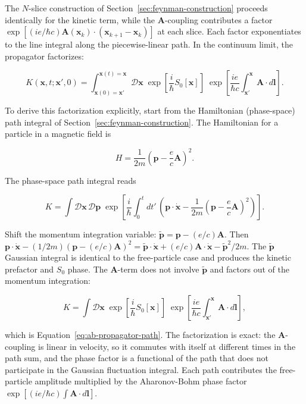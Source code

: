 The $N$-slice construction of Section~\ref{sec:feynman-construction} proceeds identically for the kinetic term, while the $\bm A$-coupling contributes a factor $\exp[(ie/\hbar c)\bm A(\bm x_k)\cdot(\bm x_{k+1}-\bm x_k)]$ at each slice. Each factor exponentiates to the line integral along the piecewise-linear path. In the continuum limit, the propagator factorizes:
\begin{linenomath}
\begin{equation}
K(\bm x,t;\bm x',0) = \int_{\bm x(0)=\bm x'}^{\bm x(t)=\bm x} \mathcal{D}\bm x\; \exp\left[\frac{i}{\hbar}S_0[\bm x]\right]\;\exp\left[\frac{ie}{\hbar c}\int_{\bm x'}^{\bm x}\bm A\cdot d\bm l\right].
\label{eq:ab-propagator-path}
\end{equation}
\end{linenomath}
To derive this factorization explicitly, start from the Hamiltonian (phase-space) path integral of Section~\ref{sec:feynman-construction}. The Hamiltonian for a particle in a magnetic field is
\begin{linenomath}
\begin{equation}
H = \frac{1}{2m}\left(\bm p - \frac{e}{c}\bm A\right)^2.
\end{equation}
\end{linenomath}
The phase-space path integral reads
\begin{linenomath}
\begin{equation}
K = \int \mathcal{D}\bm x\,\mathcal{D}\bm p\; \exp\left[\frac{i}{\hbar}\int_0^t dt'\,\left(\bm p\cdot\dot{\bm x} - \frac{1}{2m}\left(\bm p - \frac{e}{c}\bm A\right)^2\right)\right].
\end{equation}
\end{linenomath}
Shift the momentum integration variable: $\tilde{\bm p} = \bm p - (e/c)\bm A$. Then $\bm p\cdot\dot{\bm x} - (1/2m)(\bm p - (e/c)\bm A)^2 = \tilde{\bm p}\cdot\dot{\bm x} + (e/c)\bm A\cdot\dot{\bm x} - \tilde{\bm p}^2/2m$. The $\tilde{\bm p}$ Gaussian integral is identical to the free-particle case and produces the kinetic prefactor and $S_0$ phase. The $\bm A$-term does not involve $\tilde{\bm p}$ and factors out of the momentum integration:
\begin{linenomath}
\begin{equation}
K = \int \mathcal{D}\bm x\; \exp\left[\frac{i}{\hbar}S_0[\bm x]\right]\;\exp\left[\frac{ie}{\hbar c}\int_{\bm x'}^{\bm x}\bm A\cdot d\bm l\right],
\end{equation}
\end{linenomath}
which is Equation~\eqref{eq:ab-propagator-path}. The factorization is exact: the $\bm A$-coupling is linear in velocity, so it commutes with itself at different times in the path sum, and the phase factor is a functional of the path that does not participate in the Gaussian fluctuation integral. Each path contributes the free-particle amplitude multiplied by the Aharonov-Bohm phase factor $\exp[(ie/\hbar c)\int\bm A\cdot d\bm l]$.

